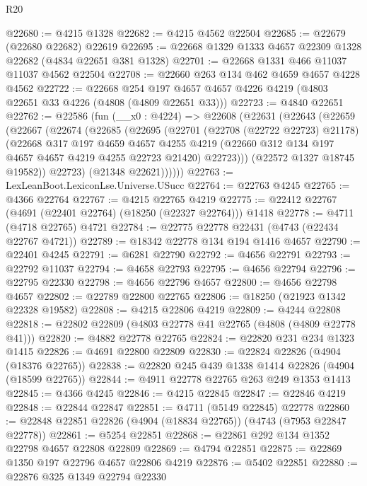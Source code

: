 \begin{lexlean}{R20}
\begin{coremodule}
@22680 := @4215 @1328
@22682 := @4215 @4562 @22504
@22685 := @22679 (@22680 @22682) @22619
@22695 := @22668 @1329 @1333 @4657 @22309 @1328 @22682 (@4834 @22651 @381 @1328)
@22701 := @22668 @1331 @466 @11037 @11037 @4562 @22504
@22708 := @22660 @263 @134 @462 @4659 @4657 @4228 @4562
@22722 := @22668
    @254
    @197
    @4657
    @4657
    @4226
    @4219
    (@4803 @22651 @33 @4226 (@4808 (@4809 @22651 @33)))
@22723 := @4840 @22651
@22762 := @22586
    (fun (__x0 : @4224) =>
    @22608
      (@22631
        (@22643
          (@22659
            (@22667
              (@22674
                (@22685
                  (@22695
                    (@22701
                      (@22708 (@22722 @22723) @21178)
                      (@22668
                        @317
                        @197
                        @4659
                        @4657
                        @4255
                        @4219
                        (@22660 @312 @134 @197 @4657 @4657 @4219 @4255 @22723 @21420)
                        @22723)))
                  (@22572 @1327 @18745 @19582))
                @22723)
              (@21348 @22621))))))
@22763 := LexLeanBoot.LexiconLse.Universe.USucc
@22764 := @22763 @4245
@22765 := @4366 @22764
@22767 := @4215 @22765 @4219
@22775 := @22412 @22767 (@4691 (@22401 @22764) (@18250 (@22327 @22764))) @1418
@22778 := @4711 (@4718 @22765) @4721
@22784 := @22775 @22778 @22431 (@4743 (@22434 @22767 @4721))
@22789 := @18342 @22778 @134 @194 @1416 @4657
@22790 := @22401 @4245
@22791 := @6281 @22790
@22792 := @4656 @22791
@22793 := @22792 @11037
@22794 := @4658 @22793
@22795 := @4656 @22794
@22796 := @22795 @22330
@22798 := @4656 @22796 @4657
@22800 := @4656 @22798 @4657
@22802 := @22789 @22800 @22765
@22806 := @18250 (@21923 @1342 @22328 @19582)
@22808 := @4215 @22806 @4219
@22809 := @4244 @22808
@22818 := @22802 @22809 (@4803 @22778 @41 @22765 (@4808 (@4809 @22778 @41)))
@22820 := @4882 @22778 @22765
@22824 := @22820 @231 @234 @1323 @1415
@22826 := @4691 @22800 @22809
@22830 := @22824 @22826 (@4904 (@18376 @22765))
@22838 := @22820 @245 @439 @1338 @1414 @22826 (@4904 (@18599 @22765))
@22844 := @4911 @22778 @22765 @263 @249 @1353 @1413
@22845 := @4366 @4245
@22846 := @4215 @22845
@22847 := @22846 @4219
@22848 := @22844 @22847
@22851 := @4711 (@5149 @22845) @22778
@22860 := @22848 @22851 @22826 (@4904 (@18834 @22765)) (@4743 (@7953 @22847 @22778))
@22861 := @5254 @22851
@22868 := @22861 @292 @134 @1352 @22798 @4657 @22808 @22809
@22869 := @4794 @22851
@22875 := @22869 @1350 @197 @22796 @4657 @22806 @4219
@22876 := @5402 @22851
@22880 := @22876 @325 @1349 @22794 @22330

\end{coremodule}
\end{lexlean}
